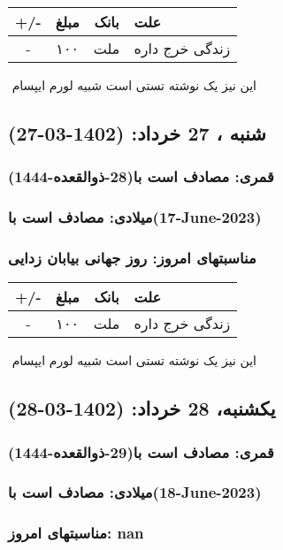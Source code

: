 \documentclass{article}
\newcommand{\rnote}[1]{\marginpar{\textcolor{color}{\StrSubstitute{\##1}{ }{\_}}}}
\newcommand{\myRow}[4]{
    #1 & #2 & #3 & #4 \\ \hline
}
\begin{document}
\begin{tabular}{ | c | c | c | p{5cm} |}
    \hline
    \myRow{ +/- }{مبلغ}{بانک}{علت}
    \myRow{-}{۱۰۰}{ملت}{زندگی خرج داره}
\end{tabular}
\newline
\newline

‌
\rnote{تست}
این نیز یک نوشته تستی است شبیه لورم ایپسام




\newpage
{}
\textcolor{color}{
\section{ شنبه ، 27 خرداد: (1402-03-27) }
\subsubsection*{قمری: مصادف است با(28-ذوالقعده-1444)} 
\subsubsection*{میلادی: مصادف است با(17-June-2023)}
\subsubsection*{مناسبتهای امروز: روز جهانی بیابان زدایی}
}


\begin{tabular}{ | c | c | c | p{5cm} |}
    \hline
    \myRow{ +/- }{مبلغ}{بانک}{علت}
    \myRow{-}{۱۰۰}{ملت}{زندگی خرج داره}
\end{tabular}
\newline
\newline

‌
\rnote{تست}
این نیز یک نوشته تستی است شبیه لورم ایپسام




\newpage
{}
\textcolor{color}{
\section{ یکشنبه، 28 خرداد: (1402-03-28) }
\subsubsection*{قمری: مصادف است با(29-ذوالقعده-1444)} 
\subsubsection*{میلادی: مصادف است با(18-June-2023)}
\subsubsection*{مناسبتهای امروز: nan}
}
\end{document}
